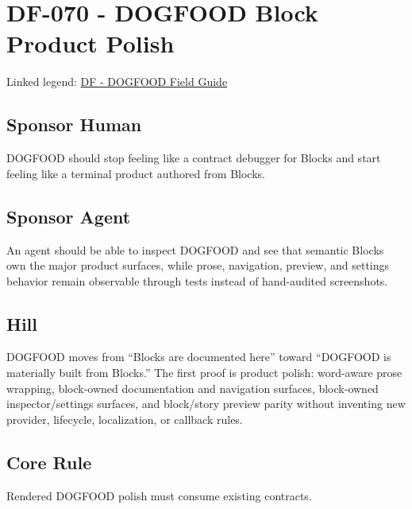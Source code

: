 \chapter{DF-070 - DOGFOOD Block Product Polish}\label{record-110}

\smallskip

Linked legend: \href{https://github.com/flyingrobots/bijou/blob/1853ad902f6bf219326409e7f743a5a1d6517dbc/docs/legends/DF-dogfood-field-guide.md}{DF - DOGFOOD Field Guide}

\section{Sponsor Human}\label{record-110-sponsor-human}

DOGFOOD should stop feeling like a contract debugger for Blocks and start feeling like a terminal product authored from Blocks.

\section{Sponsor Agent}\label{record-110-sponsor-agent}

An agent should be able to inspect DOGFOOD and see that semantic Blocks own the major product surfaces, while prose, navigation, preview, and settings behavior remain observable through tests instead of hand-audited screenshots.

\section{Hill}\label{record-110-hill}

DOGFOOD moves from ``Blocks are documented here'' toward ``DOGFOOD is materially built from Blocks.'' The first proof is product polish: word-aware prose wrapping, block-owned documentation and navigation surfaces, block-owned inspector/settings surfaces, and block/story preview parity without inventing new provider, lifecycle, localization, or callback rules.

\section{Core Rule}\label{record-110-core-rule}

Rendered DOGFOOD polish must consume existing contracts.

